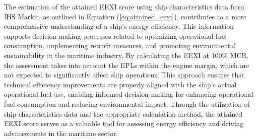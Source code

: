 The estimation of the attained EEXI score using ship characteristics data from IHS Markit, as outlined in Equation (\ref{eq:attained_eexi}), contributes to a more comprehensive understanding of a ship's energy efficiency.
This information supports decision-making processes related to optimizing operational fuel consumption, implementing retrofit measures, and promoting environmental sustainability in the maritime industry.
By calculating the EEXI at 100\% MCR, the assessment takes into account the EPLs within the engine margin, which are not expected to significantly affect ship operations.
This approach ensures that technical efficiency improvements are properly aligned with the ship's actual operational fuel use, enabling informed decision-making for enhancing operational fuel consumption and reducing environmental impact.
Through the utilization of ship characteristics data and the appropriate calculation method, the attained EEXI score serves as a valuable tool for assessing energy efficiency and driving advancements in the maritime sector.




